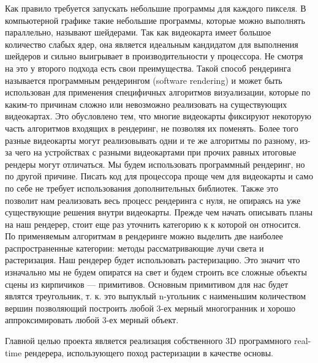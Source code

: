 \documentclass{article}
\begin{document}
Как правило требуется запускать небольшие программы для каждого 
пикселя. В компьютерной графике такие небольшие программы, которые 
можно выполнять параллельно, называют шейдерами. Так как 
видеокарта имеет большое количество слабых ядер, она является 
идеальным кандидатом для выполнения шейдеров и сильно выигрывает 
в производительности у процессора. Не смотря на это у второго 
подхода есть свои преимущества. Такой способ рендеринга называется
программным рендерингом (software rendering) и может быть 
использован для применения специфичных алгоритмов визуализации, которые 
по каким-то причинам сложно или невозможно реализовать на существующих видеокартах.
Это обусловлено тем, что многие видеокарты фиксируют некоторую 
часть алгоритмов входящих в рендеринг, не позволяя их поменять.
Более того разные видеокарты могут реализовывать одни и те же 
алгоритмы по разному, из-за чего на устройствах с разными видеокартами 
при прочих равных итоговые рендеры могут отличаться. Мы 
будем использовать программный рендеринг, но по другой причине.
Писать код для процессора проще чем для видеокарты и само по себе 
не требует использования дополнительных библиотек. Также это 
позволит нам реализовать весь процесс рендеринга с нуля, не опираясь 
на уже существующие решения внутри видеокарты. Прежде чем начать 
описывать планы на наш рендерер, стоит еще раз уточнить категорию к 
к которой он относится. По применяемым алгоритмам в рендеринге можно 
выделить две наиболее распространенные категории: методы рассматривающие 
лучи света и растеризация. Наш рендерер будет использовать растеризацию. 
Это значит что изначально мы не будем опиратся на свет и будем 
строить все сложные объекты сцены из кирпичиков --- примитивов. 
Основным примитивом для нас будет являтся треугольник, т. к. это выпуклый 
n-угольник с наименьшим количеством вершин позволяющий построить любой 
3-ех мерный многогранник и хорошо аппроксимировать любой 3-ех мерный объект.

Главной целью проекта является реализация собственного 3D программного real-time 
рендерера, использующего поход растеризации в качестве основы.
\end{document}
